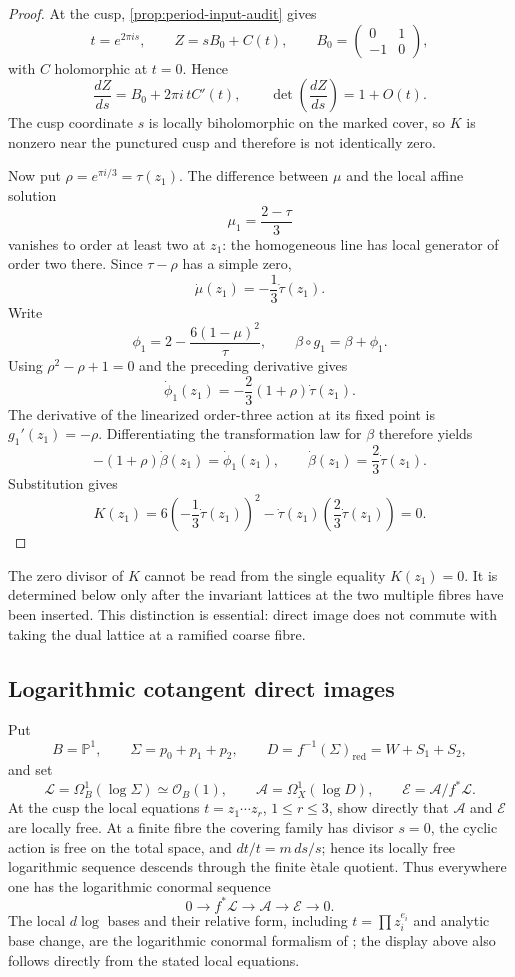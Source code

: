 \begin{proof}
At the cusp, \cref{prop:period-input-audit} gives
\[
 t=e^{2\pi i s},\qquad Z=sB_0+C(t),\qquad
 B_0=\begin{pmatrix}0&1\\-1&0\end{pmatrix},
\]
with $C$ holomorphic at $t=0$.  Hence
\[
 \frac{dZ}{ds}=B_0+2\pi i\,tC'(t),
 \qquad
 \det\!\left(\frac{dZ}{ds}\right)=1+O(t).
\]
The cusp coordinate $s$ is locally biholomorphic on the marked cover, so
$K$ is nonzero near the punctured cusp and therefore is not identically
zero.

Now put $\rho=e^{\pi i/3}=\tau(z_1)$.  The difference between $\mu$ and
the local affine solution
\[
 \mu_1=\frac{2-\tau}{3}
\]
vanishes to order at least two at $z_1$: the homogeneous line has local
generator of order two there.  Since $\tau-\rho$ has a simple zero,
\[
 \dot\mu(z_1)=-\frac13\dot\tau(z_1).
\]
Write
\[
 \phi_1=2-\frac{6(1-\mu)^2}{\tau},
 \qquad \beta\circ g_1=\beta+\phi_1.
\]
Using $\rho^2-\rho+1=0$ and the preceding derivative gives
\[
 \dot\phi_1(z_1)
 =-\frac23(1+\rho)\dot\tau(z_1).
\]
The derivative of the linearized order-three action at its fixed point is
$g_1'(z_1)=-\rho$.  Differentiating the transformation law for $\beta$
therefore yields
\[
 -(1+\rho)\dot\beta(z_1)=\dot\phi_1(z_1),
 \qquad
 \dot\beta(z_1)=\frac23\dot\tau(z_1).
\]
Substitution gives
\[
 K(z_1)=6\left(-\frac13\dot\tau(z_1)\right)^2
 -\dot\tau(z_1)\left(\frac23\dot\tau(z_1)\right)=0.
\]
\end{proof}

The zero divisor of $K$ cannot be read from the single equality $K(z_1)=0$.
It is determined below only after the invariant lattices at the two multiple
fibres have been inserted.  This distinction is essential: direct image does
not commute with taking the dual lattice at a ramified coarse fibre.

\subsection{Logarithmic cotangent direct images}

Put
\[
 B=\mathbb P^1,\qquad
 \Sigma=p_0+p_1+p_2,\qquad
 D=f^{-1}(\Sigma)_{\mathrm{red}}=W+S_1+S_2,
\]
and set
\[
 \mathcal L=\Omega_B^1(\log\Sigma)\simeq\mathcal O_B(1),\qquad
 \mathcal A=\Omega_X^1(\log D),\qquad
 \mathcal E=\mathcal A/f^*\mathcal L.
\tag{11.1}
\]
At the cusp the local equations $t=z_1\cdots z_r$, $1\le r\le3$, show
directly that $\mathcal A$ and $\mathcal E$ are locally free.  At a finite
fibre the covering family has divisor $s=0$, the cyclic action is free on the
total space, and $dt/t=m\,ds/s$; hence its locally free logarithmic sequence
descends through the finite \`etale quotient.  Thus everywhere one has the
logarithmic conormal sequence
\[
 0\longrightarrow f^*\mathcal L\longrightarrow\mathcal A
 \longrightarrow\mathcal E\longrightarrow0.
\tag{11.2}
\]
The local $d\log$ bases and their relative form, including
$t=\prod z_i^{e_i}$ and analytic base change, are the logarithmic conormal
formalism of \cite[Chapter~II, \S3.2--3.3, pp.~72--75]{Deligne1970}; the
display above also follows directly from the stated local equations.

